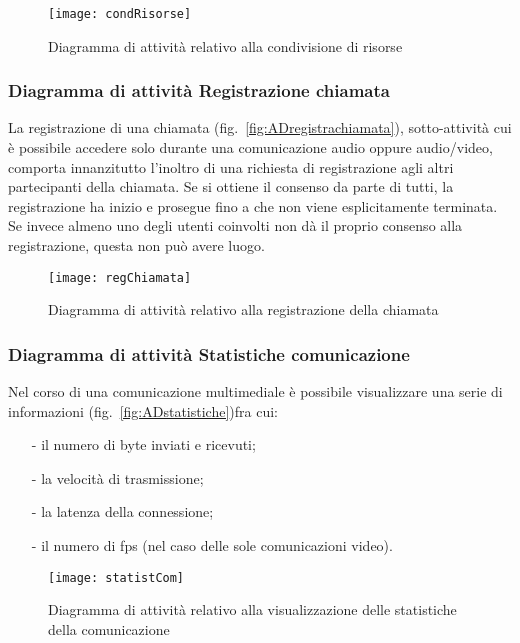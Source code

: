 \begin{figure}[H]
  \centering
  \texttt{[image: condRisorse]}
  \caption{Diagramma di attività relativo alla condivisione di risorse}\label{fig:ADcondrisorse}
\end{figure}

\subsubsection{Diagramma di attività Registrazione chiamata}
La registrazione di una chiamata (fig.~\vref{fig:ADregistrachiamata}), sotto-attività cui è possibile accedere solo durante una comunicazione audio oppure audio/video, comporta innanzitutto l'inoltro di una richiesta di registrazione agli altri partecipanti della chiamata. Se si ottiene il consenso da parte di tutti, la registrazione ha inizio e prosegue fino a che non viene esplicitamente terminata. Se invece almeno uno degli utenti coinvolti non dà il proprio consenso alla registrazione, questa non può avere luogo.

\begin{figure}[H]
  \centering
  \texttt{[image: regChiamata]}
  \caption{Diagramma di attività relativo alla registrazione della chiamata}\label{fig:ADregistrachiamata}
\end{figure}

\subsubsection{Diagramma di attività Statistiche comunicazione}
Nel corso di una comunicazione multimediale è possibile visualizzare una serie di informazioni (fig.~\vref{fig:ADstatistiche})fra cui:
\begin{itemize}[noitemsep,nolistsep]
  \item[-] il numero di byte inviati e ricevuti;
  \item[-] la velocità di trasmissione;
  \item[-] la latenza della connessione;
  \item[-] il numero di fps (nel caso delle sole comunicazioni video).
\end{itemize}

\begin{figure}[H]
  \centering
  \texttt{[image: statistCom]}
  \caption{Diagramma di attività relativo alla visualizzazione delle statistiche della comunicazione}\label{fig:ADstatistiche}
\end{figure}

